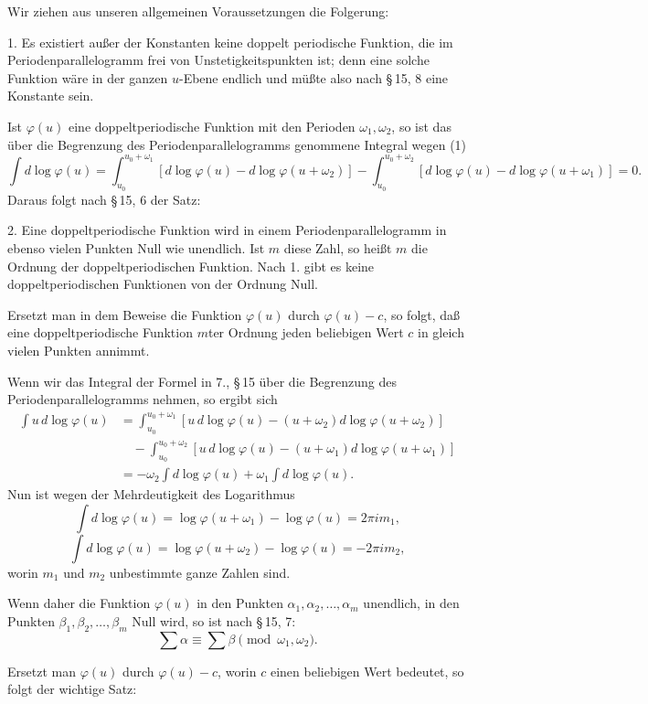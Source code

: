\documentclass[11pt]{article}
\begin{document}
Wir ziehen aus unseren allgemeinen Voraussetzungen die Folgerung:

1. Es existiert außer der Konstanten keine doppelt periodische Funktion, die im Periodenparallelogramm frei von Unstetigkeitspunkten ist; denn eine solche Funktion wäre in der ganzen $u$-Ebene endlich und müßte also nach \S\,15, 8 eine Konstante sein.

Ist $\varphi(u)$ eine doppeltperiodische Funktion mit den Perioden $\omega_1,\omega_2$, so ist das über die Begrenzung des Periodenparallelogramms genommene Integral wegen (1)
\[
\int d\log\varphi(u)
=\int_{u_0}^{u_0+\omega_1}\!\!\left[d\log\varphi(u)-d\log\varphi(u+\omega_2)\right]
-\int_{u_0}^{u_0+\omega_2}\!\!\left[d\log\varphi(u)-d\log\varphi(u+\omega_1)\right]
=0.
\]
Daraus folgt nach \S\,15, 6 der Satz:

2. Eine doppeltperiodische Funktion wird in einem Periodenparallelogramm in ebenso vielen Punkten Null wie unendlich. Ist $m$ diese Zahl, so heißt $m$ die Ordnung der doppeltperiodischen Funktion. Nach 1. gibt es keine doppeltperiodischen Funktionen von der Ordnung Null.

Ersetzt man in dem Beweise die Funktion $\varphi(u)$ durch $\varphi(u)-c$, so folgt, daß eine doppeltperiodische Funktion $m$ter Ordnung jeden beliebigen Wert $c$ in gleich vielen Punkten annimmt.

Wenn wir das Integral der Formel in 7., \S\,15 über die Begrenzung des Periodenparallelogramms nehmen, so ergibt sich
\begin{align*}
\int u\,d\log\varphi(u)
&=\int_{u_0}^{u_0+\omega_1}\!\!\left[u\,d\log\varphi(u)-(u+\omega_2)d\log\varphi(u+\omega_2)\right]\\
&\quad-\int_{u_0}^{u_0+\omega_2}\!\!\left[u\,d\log\varphi(u)-(u+\omega_1)d\log\varphi(u+\omega_1)\right]\\
&=-\omega_2\int d\log\varphi(u)+\omega_1\int d\log\varphi(u).
\end{align*}
Nun ist wegen der Mehrdeutigkeit des Logarithmus
\[
\int d\log\varphi(u)=\log\varphi(u+\omega_1)-\log\varphi(u)=2\pi i m_1,
\]
\[
\int d\log\varphi(u)=\log\varphi(u+\omega_2)-\log\varphi(u)=-2\pi i m_2,
\]
worin $m_1$ und $m_2$ unbestimmte ganze Zahlen sind.

Wenn daher die Funktion $\varphi(u)$ in den Punkten $\alpha_1,\alpha_2,\ldots,\alpha_m$ unendlich, in den Punkten $\beta_1,\beta_2,\ldots,\beta_m$ Null wird, so ist nach \S\,15, 7:
\[
\sum \alpha \equiv \sum \beta\pmod{\omega_1,\omega_2}.
\]

Ersetzt man $\varphi(u)$ durch $\varphi(u)-c$, worin $c$ einen beliebigen Wert bedeutet, so folgt der wichtige Satz:
\end{document}
